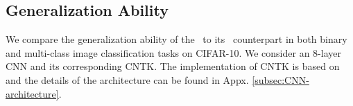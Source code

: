 \subsection{Generalization Ability}
\label{subsec:kernel-regression}
We compare the generalization ability of the \lantk~to its \agnostic~counterpart in both binary and multi-class image classification tasks on CIFAR-10.
We consider an $8$-layer CNN and its corresponding CNTK. The implementation of CNTK is based on \cite{neuraltangents2020} and the details of the architecture can be found in Appx. \ref{subsec:CNN-architecture}. 


